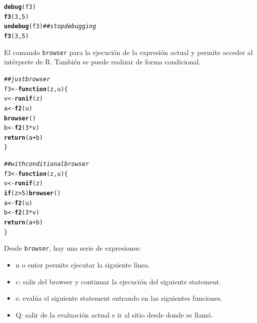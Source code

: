 \documentclass{config/apuntes}\usepackage[]{graphicx}\usepackage[]{xcolor}
\makeatletter
\newcommand{\hlnum}[1]{\textcolor[rgb]{0.686,0.059,0.569}{#1}}%
\newcommand{\hlcom}[1]{\textcolor[rgb]{0.678,0.584,0.686}{\textit{#1}}}%
\newcommand{\hlopt}[1]{\textcolor[rgb]{0,0,0}{#1}}%
\newcommand{\hldef}[1]{\textcolor[rgb]{0.345,0.345,0.345}{#1}}%
\newcommand{\hlkwa}[1]{\textcolor[rgb]{0.161,0.373,0.58}{\textbf{#1}}}%
\newcommand{\hlkwb}[1]{\textcolor[rgb]{0.69,0.353,0.396}{#1}}%
\newcommand{\hlkwc}[1]{\textcolor[rgb]{0.333,0.667,0.333}{#1}}%
\newcommand{\hlkwd}[1]{\textcolor[rgb]{0.737,0.353,0.396}{\textbf{#1}}}%
\newenvironment{kframe}{%
 \def\at@end@of@kframe{}%
 \ifinner\ifhmode%
  \def\at@end@of@kframe{\end{minipage}}%
  \begin{minipage}{\columnwidth}%
 \fi\fi%
 \def\FrameCommand##1{\hskip\@totalleftmargin \hskip-\fboxsep
 \colorbox{shadecolor}{##1}\hskip-\fboxsep
     \hskip-\linewidth \hskip-\@totalleftmargin \hskip\columnwidth}%
 \MakeFramed {\advance\hsize-\width
   \@totalleftmargin\z@ \linewidth\hsize
   \@setminipage}}%
 {\par\unskip\endMakeFramed%
 \at@end@of@kframe}
\newenvironment{knitrout}{}{} %
\newcommand{\code}[1]{\texttt{#1}}
\makeatother
\begin{document}
\begin{knitrout}
\color{fgcolor}\begin{kframe}
\begin{alltt}
\hlkwd{debug}\hldef{(f3)}
\hlkwd{f3}\hldef{(}\hlnum{3}\hldef{,} \hlnum{5}\hldef{)}
\hlkwd{undebug}\hldef{(f3)} \hlcom{## stop debugging}
\hlkwd{f3}\hldef{(}\hlnum{3}\hldef{,} \hlnum{5}\hldef{)}
\end{alltt}
\end{kframe}
\end{knitrout}

El comando \code{browser} para la ejecución de la expresión actual y permite acceder al intérprete de R. También se puede realizar de forma condicional.

\begin{knitrout}
\color{fgcolor}\begin{kframe}
\begin{alltt}
\hlcom{## just browser}
\hldef{f3} \hlkwb{<-} \hlkwa{function}\hldef{(}\hlkwc{z}\hldef{,} \hlkwc{u}\hldef{) \{}
    \hldef{v} \hlkwb{<-} \hlkwd{runif}\hldef{(z)}
    \hldef{a} \hlkwb{<-} \hlkwd{f2}\hldef{(u)}
    \hlkwd{browser}\hldef{()}
    \hldef{b} \hlkwb{<-} \hlkwd{f2}\hldef{(}\hlnum{3} \hlopt{*} \hldef{v)}
    \hlkwd{return}\hldef{(a} \hlopt{+} \hldef{b)}
\hldef{\}}

\hlcom{## with conditional browser}
\hldef{f3} \hlkwb{<-} \hlkwa{function}\hldef{(}\hlkwc{z}\hldef{,} \hlkwc{u}\hldef{) \{}
    \hldef{v} \hlkwb{<-} \hlkwd{runif}\hldef{(z)}
    \hlkwa{if} \hldef{(z} \hlopt{>} \hlnum{5}\hldef{)} \hlkwd{browser}\hldef{()}
    \hldef{a} \hlkwb{<-} \hlkwd{f2}\hldef{(u)}
    \hldef{b} \hlkwb{<-} \hlkwd{f2}\hldef{(}\hlnum{3} \hlopt{*} \hldef{v)}
    \hlkwd{return}\hldef{(a} \hlopt{+} \hldef{b)}
\hldef{\}}
\end{alltt}
\end{kframe}
\end{knitrout}

Desde \code{browser}, hay una serie de expresiones:
\begin{itemize}
\item n o enter permite ejecutar la siguiente línea.
\item c: salir del browser y continuar la ejecución del siguiente statement.
\item s: evalúa el siguiente statement entrando en las siguientes funciones.
\item Q: salir de la evaluación actual e ir al sitio desde donde se llamó.
\end{itemize}
\end{document}
